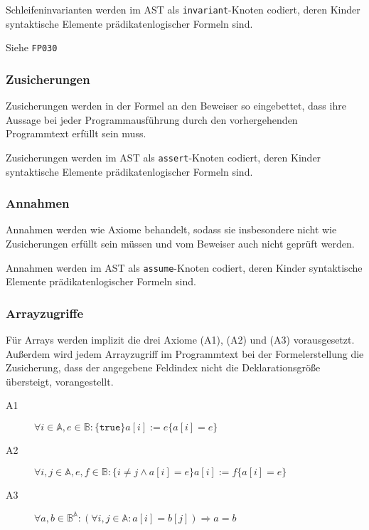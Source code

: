 Schleifeninvarianten werden im AST als \texttt{invariant}-Knoten
codiert, deren Kinder syntaktische Elemente prädikatenlogischer
Formeln sind.%

Siehe \texttt{FP030}%

\subsubsection{Zusicherungen}%

Zusicherungen werden in der Formel an den Beweiser so eingebettet,
dass ihre Aussage bei jeder Programmausführung durch den
vorhergehenden Programmtext erfüllt sein muss.%

Zusicherungen werden im AST als \texttt{assert}-Knoten codiert, deren
Kinder syntaktische Elemente prädikatenlogischer Formeln sind.%

\subsubsection{Annahmen}%

Annahmen werden wie Axiome behandelt, sodass sie insbesondere nicht
wie Zusicherungen erfüllt sein müssen und vom Beweiser auch nicht
geprüft werden.%

Annahmen werden im AST als \texttt{assume}-Knoten codiert,
deren Kinder syntaktische Elemente prädikatenlogischer Formeln sind.%

\subsubsection{Arrayzugriffe}%

Für Arrays werden implizit die drei Axiome (A1), (A2) und (A3)
vorausgesetzt. Außerdem wird jedem Arrayzugriff im Programmtext bei
der Formelerstellung die Zusicherung, dass der angegebene Feldindex
nicht die Deklarationsgröße übersteigt, vorangestellt.%

\begin{description}%
    \item[A1] \begin{math}\forall i \in \mathbb{A}, e \in \mathbb{B} : \{\texttt{true}\} a[i] := e \{a[i] = e\}\end{math}%
    \item[A2] \begin{math}\forall i, j \in \mathbb{A}, e, f \in \mathbb{B} : \{i \neq j \wedge a[i] = e\} a[i] := f \{a[i] = e\}\end{math}%
    \item[A3] \begin{math}\forall a, b \in \mathbb{B}^\mathbb{A} : (\forall i, j \in \mathbb{A} : a[i] = b[j]) \Rightarrow a = b\end{math}%
\end{description}%

